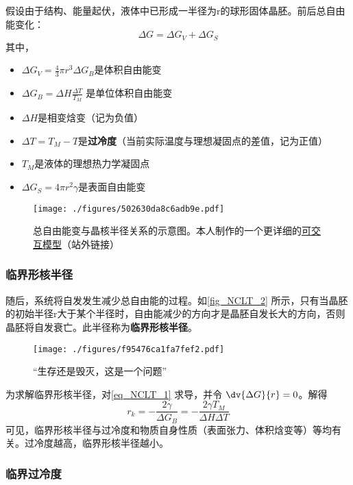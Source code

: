 假设由于结构、能量起伏，液体中已形成一半径为r的球形固体晶胚。前后总自由能变化： 
\begin{equation}\label{eq_NCLT_1}
\Delta G  = \Delta G_V +\Delta G_S
\end{equation}
其中，
\begin{itemize}
\item $\Delta G_V = \frac{4}{3}\pi r^3 \Delta G_B$是体积自由能变
\item $\Delta G_B = \Delta H \frac{\Delta T}{T_M}$ 是单位体积自由能变
\item $\Delta H$是相变焓变（记为负值）
\item $\Delta T=T_M-T$是\textbf{过冷度}（当前实际温度与理想凝固点的差值，记为正值）
\item $T_M$是液体的理想热力学凝固点
\item $\Delta G_S = 4\pi r^2 \gamma$是表面自由能变
\end{itemize}

\begin{figure}[ht]
\centering
\texttt{[image: ./figures/502630da8c6adb9e.pdf]}
\caption{总自由能变与晶核半径关系的示意图。本人制作的一个更详细的\href{https://www.geogebra.org/m/prktxhhk}{可交互模型}（站外链接）} \label{fig_NCLT_2}
\end{figure}

\subsubsection{临界形核半径}
随后，系统将自发发生减少总自由能的过程。如\autoref{fig_NCLT_2} 所示，只有当晶胚的初始半径r大于某个半径时，自由能减少的方向才是晶胚自发长大的方向，否则晶胚将自发衰亡。此半径称为\textbf{临界形核半径}。
\begin{figure}[ht]
\centering
\texttt{[image: ./figures/f95476ca1fa7fef2.pdf]}
\caption{“生存还是毁灭，这是一个问题”} \label{fig_NCLT_3}
\end{figure}

为求解临界形核半径，对\autoref{eq_NCLT_1} 求导，并令 $\dv{\Delta G}{r} = 0$。解得
\begin{equation}
r_k=-\frac{2\gamma}{\Delta G_B}=-\frac{2\gamma T_M}{\Delta H \Delta T}
\end{equation}
可见，临界形核半径与过冷度和物质自身性质（表面张力、体积焓变等）等均有关。过冷度越高，临界形核半径越小。

\subsubsection{临界过冷度}

